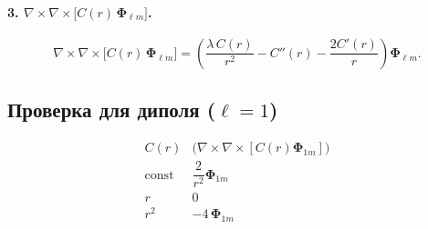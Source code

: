 \documentclass{article}
\begin{document}
\paragraph{3. \(\displaystyle\nabla\times\nabla\times\!\bigl[C(r)\,\bm{\Phi}_{\ell m}\bigr]\).}

\begin{equation}
\nabla\times\nabla\times\!\bigl[C(r)\,\bm{\Phi}_{\ell m}\bigr]
  =\left(\frac{\lambda\,C(r)}{r^{2}}
         -C''(r)-\frac{2C'(r)}{r}\right)\bm{\Phi}_{\ell m}.
\end{equation}

\subsection*{Проверка для диполя (\(\ell=1\))}

\[
\begin{array}{c|c}
C(r) & \bigl(\nabla\times\nabla\times[C(r)\bm{\Phi}_{1m}]\bigr) \\
\hline
\text{const} & \dfrac{2}{r^{2}}\bm{\Phi}_{1m} \\
r            & 0 \\
r^{2}        & -4\,\bm{\Phi}_{1m}
\end{array}
\]
\end{document}
